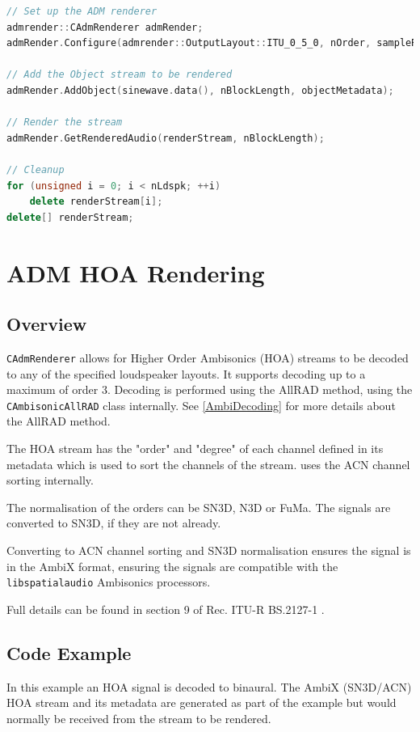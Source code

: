\documentclass[12pt]{report}
\def\libspataud{\texttt{libspatialaudio}\xspace}
\newcommand{\code}[1]{\texttt{#1}}
\begin{document}
\begin{lstlisting}[language=C++]
// Set up the ADM renderer
admrender::CAdmRenderer admRender;
admRender.Configure(admrender::OutputLayout::ITU_0_5_0, nOrder, sampleRate, nBlockLength, streamInfo);

// Add the Object stream to be rendered
admRender.AddObject(sinewave.data(), nBlockLength, objectMetadata);

// Render the stream
admRender.GetRenderedAudio(renderStream, nBlockLength);

// Cleanup
for (unsigned i = 0; i < nLdspk; ++i)
    delete renderStream[i];
delete[] renderStream;
\end{lstlisting}

\section{ADM HOA Rendering}\label{AdmHOA}

\subsection{Overview}

\code{CAdmRenderer} allows for Higher Order Ambisonics (HOA) streams to be decoded to any of the specified loudspeaker layouts.
It supports decoding up to a maximum of order 3.
Decoding is performed using the AllRAD method, using the \code{CAmbisonicAllRAD} class internally. See \cref{AmbiDecoding} for more details about the AllRAD method.

The HOA stream has the "order" and "degree" of each channel defined in its metadata which is used to sort the channels of the stream.
\cite{CAdmRenderer} uses the ACN channel sorting internally.

The normalisation of the orders can be SN3D, N3D or FuMa.
The signals are converted to SN3D, if they are not already.

Converting to ACN channel sorting and SN3D normalisation ensures the signal is in the AmbiX format, ensuring the signals are compatible with the \libspataud Ambisonics processors.

Full details can be found in section 9 of Rec. ITU-R BS.2127-1 \cite{ITU2127}.

\subsection{Code Example}

In this example an HOA signal is decoded to binaural. The AmbiX (SN3D/ACN) HOA stream and its metadata are generated as part of the example but would normally be received from the stream to be rendered.
\end{document}
